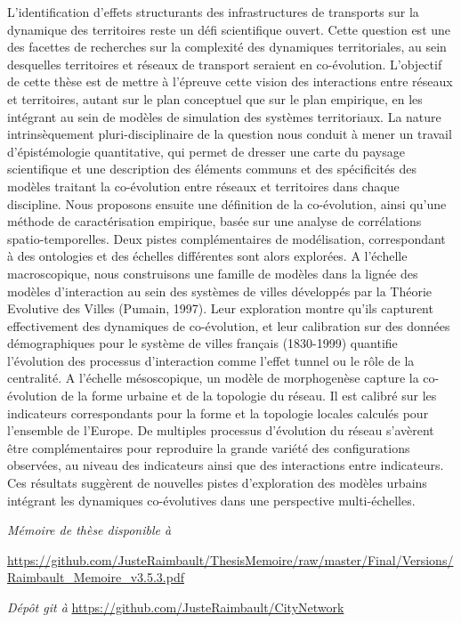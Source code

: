 \documentclass[9pt,a4]{article}
\begin{document}
\noindent
L'identification d'effets structurants des infrastructures de transports sur la dynamique des territoires reste un défi scientifique ouvert. Cette question est une des facettes de recherches sur la complexité des dynamiques territoriales, au sein desquelles territoires et réseaux de transport seraient en co-évolution. L'objectif de cette thèse est de mettre à l'épreuve cette vision des interactions entre réseaux et territoires, autant sur le plan conceptuel que sur le plan empirique, en les intégrant au sein de modèles de simulation des systèmes territoriaux. La nature intrinsèquement pluri-disciplinaire de la question nous conduit à mener un travail d'épistémologie quantitative, qui permet de dresser une carte du paysage scientifique et une description des éléments communs et des spécificités des modèles traitant la co-évolution entre réseaux et territoires dans chaque discipline. Nous proposons ensuite une définition de la co-évolution, ainsi qu'une méthode de caractérisation empirique, basée sur une analyse de corrélations spatio-temporelles. Deux pistes complémentaires de modélisation, correspondant à des ontologies et des échelles différentes sont alors explorées. A l'échelle macroscopique, nous construisons une famille de modèles dans la lignée des modèles d'interaction au sein des systèmes de villes développés par la Théorie Evolutive des Villes (Pumain, 1997). Leur exploration montre qu'ils capturent effectivement des dynamiques de co-évolution, et leur calibration sur des données démographiques pour le système de villes français (1830-1999) quantifie l'évolution des processus d'interaction comme l'effet tunnel ou le rôle de la centralité. A l'échelle mésoscopique, un modèle de morphogenèse capture la co-évolution de la forme urbaine et de la topologie du réseau. Il est calibré sur les indicateurs correspondants pour la forme et la topologie locales calculés pour l'ensemble de l'Europe. De multiples processus d'évolution du réseau s'avèrent être complémentaires pour reproduire la grande variété des configurations observées, au niveau des indicateurs ainsi que des interactions entre indicateurs. Ces résultats suggèrent de nouvelles pistes d'exploration des modèles urbains intégrant les dynamiques co-évolutives dans une perspective multi-échelles.

\bigskip

\noindent\textit{Mémoire de thèse disponible à }\\\raggedright\url{https://github.com/JusteRaimbault/ThesisMemoire/raw/master/Final/Versions/Raimbault_Memoire_v3.5.3.pdf}

\bigskip

\noindent\textit{Dépôt git à }\url{https://github.com/JusteRaimbault/CityNetwork}

\vfill
\null

\end{document}
